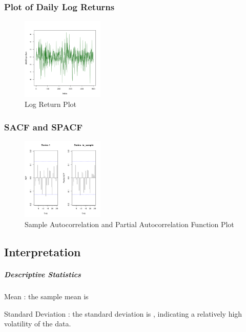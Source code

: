 \documentclass{article}
\begin{document}
\subsubsection*{Plot of Daily Log Returns}

\begin{figure}[H]
    \centering
    \includegraphics[width=0.35\textwidth]{../../docs/figures/log_return_plot.png}
    \caption{Log Return Plot}
    \label{fig:logreturn}
\end{figure}

\subsubsection*{SACF and SPACF}

\begin{figure}[H]
    \centering
    \includegraphics[width=0.35\textwidth]{../../docs/figures/PACF.png}
    \caption{Sample Autocorrelation and Partial Autocorrelation Function Plot}
    \label{fig:pacf}
\end{figure}

\subsection*{Interpretation}

\subparagraph{Descriptive Statistics}  

Mean : the sample mean is \amu 

Standard Deviation : the standard deviation is \asigma, indicating a relatively high volatility of the data. 
\end{document}
